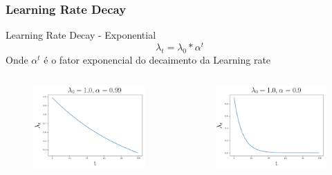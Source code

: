 \documentclass{beamer}
\begin{document}
\begin{frame}
	\frametitle{Learning Rate Decay}
	\begin{block}{Learning Rate Decay - Exponential}
		$$\lambda_t = \lambda_0 *\alpha^t$$ 
		Onde $\alpha^t$ é o fator exponencial do decaimento da Learning rate
		\begin{columns}
			\begin{column}{0.3 \textwidth}
				\begin{figure}
					\centering
					\includegraphics[width=1\linewidth]{figures/lr_decay4.png}
				\end{figure}
			\end{column}
			\begin{column}{0.3 \textwidth}
				\begin{figure}
					\centering
					\includegraphics[width=1\linewidth]{figures/lr_decay5.png}

\end{figure}
\end{column}
\end{columns}
\end{block}
\end{frame}
\end{document}
